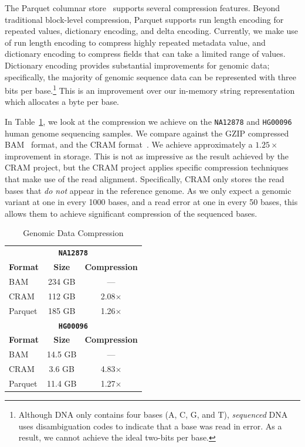 \documentclass{acm_proc_article-sp}
\begin{document}
The Parquet columnar store~\cite{parquet} supports several compression features. Beyond traditional block-level
compression, Parquet supports run length encoding for repeated values, dictionary encoding, and delta
encoding. Currently, we make use of run length encoding to compress highly repeated metadata value,
and dictionary encoding to compress fields that can take a limited range of values. Dictionary encoding provides
substantial improvements for genomic data; specifically, the majority of genomic sequence data can be
represented with three bits per base.\footnote{Although DNA only contains four bases (A, C, G, and T),
\emph{sequenced} DNA uses disambiguation codes to indicate that a base was read in error. As a result, we
cannot achieve the ideal two-bits per base.} This is an improvement over our in-memory string representation
which allocates a byte per base.

In Table~\ref{tab:genomic-compression}, we look at the compression we achieve on the \texttt{NA12878}
and \texttt{HG00096} human genome sequencing samples. We compare against the
GZIP compressed BAM~\cite{li09} format, and the CRAM format~\cite{fritz11}. We achieve approximately a
$1.25\times$ improvement in storage. This is not as impressive as the result achieved by the CRAM project,
but the CRAM project applies specific compression techniques that make use of the read alignment. Specifically,
CRAM only stores the read bases that \emph{do not} appear in the reference genome. As we only expect a
genomic variant at one in every 1000 bases, and a read error at one in every 50 bases, this allows them to
achieve significant compression of the sequenced bases.

\begin{table}[h]
\caption{Genomic Data Compression}
\label{tab:genomic-compression}
\begin{center}
\begin{tabular}{ l c c }
\hline
\multicolumn{3}{c}{\bf \texttt{NA12878}} \\
\bf Format & \bf Size & \bf Compression \\
\hline
\hline
BAM & 234 GB & --- \\
CRAM & 112 GB & 2.08$\times$ \\
Parquet & 185 GB & 1.26$\times$ \\
\hline
\multicolumn{3}{c}{\bf \texttt{HG00096}} \\
\bf Format & \bf Size & \bf Compression \\
\hline
\hline
BAM & 14.5 GB & --- \\
CRAM & 3.6 GB & 4.83$\times$ \\
Parquet & 11.4 GB & 1.27$\times$ \\
\hline
\end{tabular}
\end{center}
\end{table}
\end{document}
